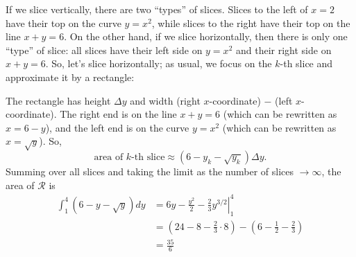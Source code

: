 \documentclass{article}
\begin{document}
\begin{enumerate}
\begin{solution}
    If we slice vertically, there are two ``types'' of slices.  Slices to
    the left of $x = 2$ have their top on the curve $y = x^2$, while
    slices to the right have their top on the line $x + y = 6$.  On the
    other hand, if we slice horizontally, then there is only one ``type''
    of slice: all slices have their left side on $y = x^2$ and their right
    side on $x + y = 6$.  So, let's slice horizontally; as usual, we focus
    on the $k$-th slice and approximate it by a rectangle:
    \begin{center}
    \end{center}
    The rectangle has height $\Delta y$ and width (right $x$-coordinate)
    $-$ (left $x$-coordinate).  The right end is on the line $x + y = 6$
    (which can be rewritten as $x = 6 - y$), and the left end is on the
    curve $y = x^2$ (which can be rewritten as $x = \sqrt{y}$).  So,
    \[ \text{area of $k$-th slice} \approx \left( 6 - y_k - \sqrt{y_k}
    \right) \Delta y.\] Summing over all slices and taking the limit as
    the number of slices $\to \infty$, the area of $\mathcal{R}$ is
    \begin{align*}
      \int_1^4 \left( 6 - y - \sqrt{y} \right) dy &= \left. 6y -
        \frac{y^2}{2} - \frac{2}{3} y^{3/2} \right|_1^4 \\
      &= \left( 24 - 8 - \frac{2}{3} \cdot 8 \right) - \left( 6 -
        \frac{1}{2} - \frac{2}{3} \right) \\
      &= \boxed{\frac{35}{6}}
    \end{align*}
  \end{solution}




\end{enumerate}
\end{document}
